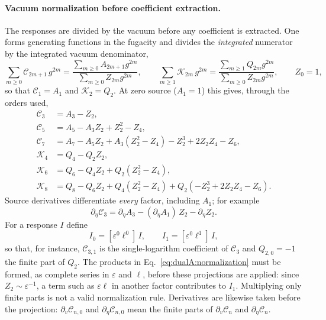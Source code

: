 \documentclass[11pt,a4paper]{article}
\numberwithin{equation}{section}
\begin{document}
\paragraph{Vacuum normalization before coefficient extraction.} The responses are divided by the vacuum before any
coefficient is extracted. One forms generating functions in the fugacity and divides the \emph{integrated} numerator
by the integrated vacuum denominator,
\begin{equation}
 \sum_{m\ge0}\mathcal C_{2m+1}\,g^{2m}=\frac{\sum_{m\ge0}A_{2m+1}g^{2m}}{\sum_{m\ge0}Z_{2m}g^{2m}},\qquad
 \sum_{m\ge1}\mathcal K_{2m}\,g^{2m}=\frac{\sum_{m\ge1}Q_{2m}g^{2m}}{\sum_{m\ge0}Z_{2m}g^{2m}},\qquad Z_0=1,
 \label{eq:dualA:genfun}
\end{equation}
so that $\mathcal C_1=A_1$ and $\mathcal K_2=Q_2$. At zero source ($A_1=1$) this gives, through the orders used,
\begin{equation}
\begin{aligned}
 \mathcal C_3&=A_3-Z_2,\\
 \mathcal C_5&=A_5-A_3Z_2+Z_2^2-Z_4,\\
 \mathcal C_7&=A_7-A_5Z_2+A_3(Z_2^2-Z_4)-Z_2^3+2Z_2Z_4-Z_6,\\
 \mathcal K_4&=Q_4-Q_2Z_2,\\
 \mathcal K_6&=Q_6-Q_4Z_2+Q_2(Z_2^2-Z_4),\\
 \mathcal K_8&=Q_8-Q_6Z_2+Q_4(Z_2^2-Z_4)+Q_2(-Z_2^3+2Z_2Z_4-Z_6).
\end{aligned}
\label{eq:dualA:normalization}
\end{equation}
Source derivatives differentiate \emph{every} factor, including $A_1$; for example
\begin{equation}
 \partial_\eta\mathcal C_3=\partial_\eta A_3-(\partial_\eta A_1)\,Z_2-\partial_\eta Z_2.
\end{equation}
For a response $I$ define
\begin{equation}
 I_0=[\varepsilon^0\ell^0]\,I,\qquad I_1=[\varepsilon^0\ell^1]\,I,
 \label{eq:dualA:I0I1}
\end{equation}
so that, for instance, $\mathcal C_{3,1}$ is the single-logarithm coefficient of $\mathcal C_3$ and $Q_{2,0}=-1$ the
finite part of $Q_2$. The products in Eq.~\eqref{eq:dualA:normalization} must be formed, as complete series in
$\varepsilon$ and $\ell$, before these projections are applied: since $Z_2\sim\varepsilon^{-1}$, a term such as
$\varepsilon\ell$ in another factor contributes to $I_1$. Multiplying only finite parts is not a valid normalization
rule. Derivatives are likewise taken before the projection: $\partial_v\mathcal C_{n,0}$ and $\partial_\eta\mathcal
C_{n,0}$ mean the finite parts of $\partial_v\mathcal C_n$ and $\partial_\eta\mathcal C_n$.
\end{document}
